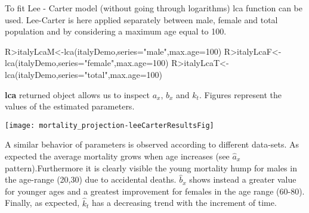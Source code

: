 \documentclass[nojss]{jss}
\begin{document}
To fit Lee - Carter model (without going through logarithms) lca function can be used. Lee-Carter is here applied separately between male, female and total population and by considering a maximum age equal to 100.

\begin{Schunk}
\begin{Sinput}
R>italyLcaM<-lca(italyDemo,series="male",max.age=100)
R>italyLcaF<-lca(italyDemo,series="female",max.age=100)
R>italyLcaT<-lca(italyDemo,series="total",max.age=100)
\end{Sinput}
\end{Schunk}

\textbf{lca} returned object allows us to inspect $a_x$, $b_x$ and $k_t$. Figures represent the values of the estimated parameters. 

\begin{Schunk}
\end{Schunk}
\texttt{[image: mortality\_projection-leeCarterResultsFig]}

A similar behavior of parameters is observed according to different data-sets. As expected the average mortality grows when age increases (see $_{x}$ pattern).Furthermore it is clearly visible the young mortality hump for males in the age-range (20,30) due to accidental deaths. $_{x}$ shows instead a greater value for younger ages and a greatest improvement for females in the age range (60-80).
Finally, as expected, $_{t}$ has a decreasing trend with the increment of time. \\
\end{document}
